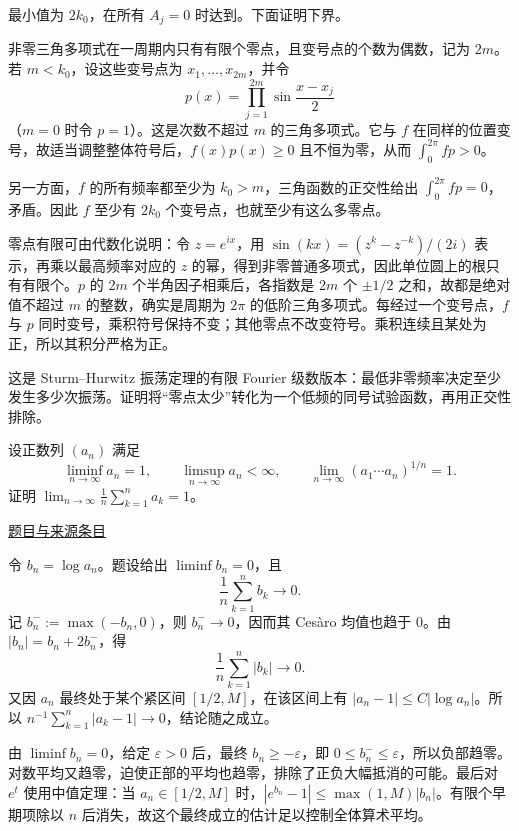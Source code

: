 \documentclass[12pt,fontset=fandol]{ctexart}
\begin{document}
\begin{solve}\label{ans:fin03-all:3}

最小值为 $2k_0$，在所有 $A_j=0$ 时达到。下面证明下界。

非零三角多项式在一周期内只有有限个零点，且变号点的个数为偶数，记为 $2m$。若 $m<k_0$，设这些变号点为 $x_1,\ldots,x_{2m}$，并令
\[
p(x)=\prod_{j=1}^{2m}\sin\frac{x-x_j}{2}
\]
（$m=0$ 时令 $p=1$）。这是次数不超过 $m$ 的三角多项式。它与 $f$ 在同样的位置变号，故适当调整整体符号后，$f(x)p(x)\ge0$ 且不恒为零，从而 $\int_0^{2\pi}fp>0$。

另一方面，$f$ 的所有频率都至少为 $k_0>m$，三角函数的正交性给出 $\int_0^{2\pi}fp=0$，矛盾。因此 $f$ 至少有 $2k_0$ 个变号点，也就至少有这么多零点。

零点有限可由代数化说明：令 $z=e^{ix}$，用 $\sin(kx)=(z^k-z^{-k})/(2i)$ 表示，再乘以最高频率对应的 $z$ 的幂，得到非零普通多项式，因此单位圆上的根只有有限个。$p$ 的 $2m$ 个半角因子相乘后，各指数是 $2m$ 个 $\pm1/2$ 之和，故都是绝对值不超过 $m$ 的整数，确实是周期为 $2\pi$ 的低阶三角多项式。每经过一个变号点，$f$ 与 $p$ 同时变号，乘积符号保持不变；其他零点不改变符号。乘积连续且某处为正，所以其积分严格为正。

\end{solve}

\begin{remark}[方法与条件]这是 Sturm--Hurwitz 振荡定理的有限 Fourier 级数版本：最低非零频率决定至少发生多少次振荡。证明将“零点太少”转化为一个低频的同号试验函数，再用正交性排除。\end{remark}

\begin{example}[来源序号4]\label{ex:fin03-all:4}\label{pr:fin03-all:4}

设正数列 $(a_n)$ 满足
\[
\liminf_{n\to\infty}a_n=1,\qquad
\limsup_{n\to\infty}a_n<\infty,\qquad
\lim_{n\to\infty}(a_1\cdots a_n)^{1/n}=1.
\]
证明 $\displaystyle\lim_{n\to\infty}\frac1n\sum_{k=1}^n a_k=1$。

\par\href{https://github.com/lzxcr/cmc-mathematics/blob/64916fa1fdbc3e444a652eca204d5669058ee321/src/problems/finals/03/04.md}{题目与来源条目}

\end{example}

\begin{solve}\label{ans:fin03-all:4}

令 $b_n=\log a_n$。题设给出 $\liminf b_n=0$，且
\[
\frac1n\sum_{k=1}^n b_k\longrightarrow0.
\]
记 $b_n^-:=\max(-b_n,0)$，则 $b_n^-\to0$，因而其 Cesàro 均值也趋于 $0$。由 $|b_n|=b_n+2b_n^-$，得
\[
\frac1n\sum_{k=1}^n|b_k|\longrightarrow0.
\]
又因 $a_n$ 最终处于某个紧区间 $[1/2,M]$，在该区间上有
$|a_n-1|\le C|\log a_n|$。所以 $n^{-1}\sum_{k=1}^n|a_k-1|\to0$，结论随之成立。

由 $\liminf b_n=0$，给定 $\varepsilon>0$ 后，最终 $b_n\ge-\varepsilon$，即 $0\le b_n^-\le\varepsilon$，所以负部趋零。对数平均又趋零，迫使正部的平均也趋零，排除了正负大幅抵消的可能。最后对 $e^t$ 使用中值定理：当 $a_n\in[1/2,M]$ 时，$|e^{b_n}-1|\le\max(1,M)|b_n|$。有限个早期项除以 $n$ 后消失，故这个最终成立的估计足以控制全体算术平均。

\end{solve}
\end{document}
